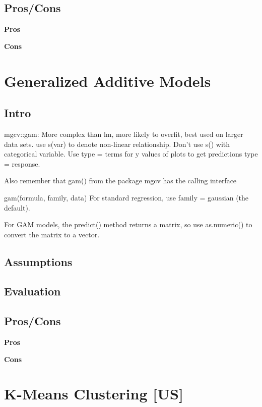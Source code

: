 \documentclass[]{book}
\theoremstyle{definition}
\theoremstyle{definition}
\theoremstyle{definition}
\theoremstyle{remark}
\begin{document}
\subsection{Pros/Cons}\label{proscons-3}

\textbf{Pros}

\textbf{Cons}

\section{Generalized Additive Models}\label{generalized-additive-models}

\subsection{Intro}\label{intro-4}

mgcv::gam: More complex than lm, more likely to overfit, best used on
larger data sets. use s(var) to denote non-linear relationship. Don't
use s() with categorical variable. Use type = terms for y values of
plots to get predictions type = response.

Also remember that gam() from the package mgcv has the calling interface

gam(formula, family, data) For standard regression, use family =
gaussian (the default).

For GAM models, the predict() method returns a matrix, so use
as.numeric() to convert the matrix to a vector.

\subsection{Assumptions}\label{assumptions-4}

\subsection{Evaluation}\label{evaluation-3}

\subsection{Pros/Cons}\label{proscons-4}

\textbf{Pros}

\textbf{Cons}

\section{K-Means Clustering {[}US{]}}\label{k-means-clustering-us}
\end{document}
